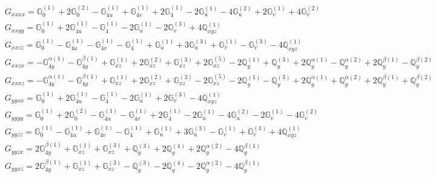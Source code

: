 \documentclass[fleqn,8pt,landscape]{jsarticle}
\begin{document}
\begin{align*}
& G_{xxxx} = \mathbb{G}_{0}^{(1)} + 2 \mathbb{G}_{0}^{(2)} - \mathbb{G}_{4u}^{(1)} + \mathbb{G}_{4v}^{(1)} + 2 \mathbb{G}_{4}^{(1)} - 2 \mathbb{G}_{u}^{(1)} - 4 \mathbb{G}_{u}^{(2)} + 2 \mathbb{G}_{v}^{(1)} + 4 \mathbb{G}_{v}^{(2)} \\
& G_{xxyy} = \mathbb{G}_{0}^{(1)} + 2 \mathbb{G}_{4u}^{(1)} - \mathbb{G}_{4}^{(1)} - 2 \mathbb{G}_{u}^{(1)} - 2 \mathbb{G}_{v}^{(3)} + 4 \mathbb{Q}_{xyz}^{(1)} \\
& G_{xxzz} = \mathbb{G}_{0}^{(1)} - \mathbb{G}_{4u}^{(1)} - \mathbb{G}_{4v}^{(1)} - \mathbb{G}_{4}^{(1)} + \mathbb{G}_{u}^{(1)} + 3 \mathbb{G}_{u}^{(3)} + \mathbb{G}_{v}^{(1)} - \mathbb{G}_{v}^{(3)} - 4 \mathbb{Q}_{xyz}^{(1)} \\
& G_{xxzx} = - \mathbb{G}_{4y}^{\alpha(1)} - \mathbb{G}_{4y}^{\beta(1)} + \mathbb{G}_{xz}^{(1)} + 2 \mathbb{G}_{xz}^{(2)} + \mathbb{G}_{xz}^{(3)} + 2 \mathbb{G}_{xz}^{(5)} - 2 \mathbb{Q}_{y}^{(1)} + \mathbb{Q}_{y}^{(3)} + 2 \mathbb{Q}_{y}^{\alpha(1)} - \mathbb{Q}_{y}^{\alpha(2)} + 2 \mathbb{Q}_{y}^{\beta(1)} - \mathbb{Q}_{y}^{\beta(2)} \\
& G_{xxxz} = - \mathbb{G}_{4y}^{\alpha(1)} - \mathbb{G}_{4y}^{\beta(1)} + \mathbb{G}_{xz}^{(1)} + 2 \mathbb{G}_{xz}^{(2)} + \mathbb{G}_{xz}^{(3)} - 2 \mathbb{G}_{xz}^{(5)} - 2 \mathbb{Q}_{y}^{(1)} - \mathbb{Q}_{y}^{(3)} + 2 \mathbb{Q}_{y}^{\alpha(1)} + \mathbb{Q}_{y}^{\alpha(2)} + 2 \mathbb{Q}_{y}^{\beta(1)} + \mathbb{Q}_{y}^{\beta(2)} \\
& G_{yyxx} = \mathbb{G}_{0}^{(1)} + 2 \mathbb{G}_{4u}^{(1)} - \mathbb{G}_{4}^{(1)} - 2 \mathbb{G}_{u}^{(1)} + 2 \mathbb{G}_{v}^{(3)} - 4 \mathbb{Q}_{xyz}^{(1)} \\
& G_{yyyy} = \mathbb{G}_{0}^{(1)} + 2 \mathbb{G}_{0}^{(2)} - \mathbb{G}_{4u}^{(1)} - \mathbb{G}_{4v}^{(1)} + 2 \mathbb{G}_{4}^{(1)} - 2 \mathbb{G}_{u}^{(1)} - 4 \mathbb{G}_{u}^{(2)} - 2 \mathbb{G}_{v}^{(1)} - 4 \mathbb{G}_{v}^{(2)} \\
& G_{yyzz} = \mathbb{G}_{0}^{(1)} - \mathbb{G}_{4u}^{(1)} + \mathbb{G}_{4v}^{(1)} - \mathbb{G}_{4}^{(1)} + \mathbb{G}_{u}^{(1)} + 3 \mathbb{G}_{u}^{(3)} - \mathbb{G}_{v}^{(1)} + \mathbb{G}_{v}^{(3)} + 4 \mathbb{Q}_{xyz}^{(1)} \\
& G_{yyzx} = 2 \mathbb{G}_{4y}^{\beta(1)} + \mathbb{G}_{xz}^{(1)} + \mathbb{G}_{xz}^{(3)} + \mathbb{Q}_{y}^{(3)} + 2 \mathbb{Q}_{y}^{(4)} + 2 \mathbb{Q}_{y}^{\alpha(2)} - 4 \mathbb{Q}_{y}^{\beta(1)} \\
& G_{yyxz} = 2 \mathbb{G}_{4y}^{\beta(1)} + \mathbb{G}_{xz}^{(1)} + \mathbb{G}_{xz}^{(3)} - \mathbb{Q}_{y}^{(3)} - 2 \mathbb{Q}_{y}^{(4)} - 2 \mathbb{Q}_{y}^{\alpha(2)} - 4 \mathbb{Q}_{y}^{\beta(1)} \\

\end{align*}
\end{document}
